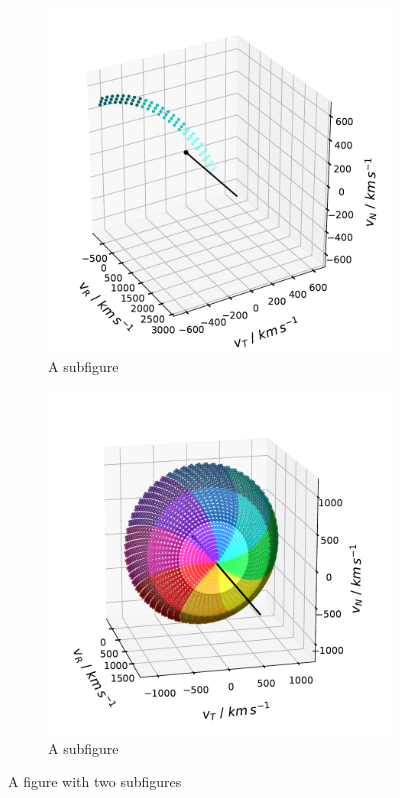 %
%
%
\begin{figure}
	\centering
	\begin{subfigure}{.5\textwidth}
		\centering
		\includegraphics[width=1\linewidth]{Figures/col_single_new.pdf}
		\caption{A subfigure}
		\label{fig:sub1}
	\end{subfigure}%
	\begin{subfigure}{.5\textwidth}
		\centering
		\includegraphics[width=1\linewidth]{Figures/col_vspace_normal.pdf}
		\caption{A subfigure}
		\label{fig:sub2}
	\end{subfigure}
	\caption{A figure with two subfigures}
	\label{fig:test}
\end{figure}
